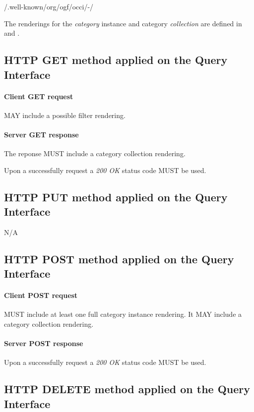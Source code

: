 \documentclass[10pt,a4paper]{article}
\begin{document}
	/.well-known/org/ogf/occi/-/

The renderings for the {\em category} instance and category {\em collection} are defined in \cite{occi:text} and \cite{occi:json}.

\subsection{HTTP GET method applied on the Query Interface}

\paragraph{Client GET request}
MAY include a possible filter rendering.

\paragraph{Server GET response}
The reponse MUST include a category collection rendering.

Upon a successfully request a \emph{200 OK} status code MUST be used.

\subsection{HTTP PUT method applied on the Query Interface}

N/A

\subsection{HTTP POST method applied on the Query Interface}

\paragraph{Client POST request}
MUST include at least one full category instance rendering. It MAY include a category collection rendering.

\paragraph{Server POST response}
Upon a successfully request a \emph{200 OK} status code MUST be used.

\subsection{HTTP DELETE method applied on the Query Interface}
\end{document}
